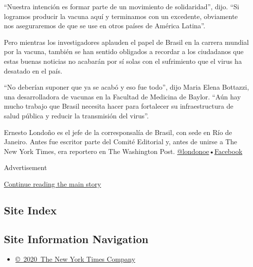 ``Nuestra intención es formar parte de un movimiento de solidaridad'',
dijo. ``Si logramos producir la vacuna aquí y terminamos con un
excedente, obviamente nos aseguraremos de que se use en otros países de
América Latina''.

Pero mientras los investigadores aplauden el papel de Brasil en la
carrera mundial por la vacuna, también se han sentido obligados a
recordar a los ciudadanos que estas buenas noticias no acabarán por sí
solas con el sufrimiento que el virus ha desatado en el país.

``No deberían suponer que ya se acabó y eso fue todo'', dijo Maria Elena
Bottazzi, una desarrolladora de vacunas en la Facultad de Medicina de
Baylor. ``Aún hay mucho trabajo que Brasil necesita hacer para
fortalecer su infraestructura de salud pública y reducir la transmisión
del virus''.

Ernesto Londoño es el jefe de la corresponsalía de Brasil, con sede en
Río de Janeiro. Antes fue escritor parte del Comité Editorial y, antes
de unirse a The New York Times, era reportero en The Washington Post.
\href{https://twitter.com/londonoe}{@londonoe}•\href{https://www.facebookcorewwwi.onion/londono}{Facebook}

Advertisement

\protect\hyperlink{after-bottom}{Continue reading the main story}

\hypertarget{site-index}{%
\subsection{Site Index}\label{site-index}}

\hypertarget{site-information-navigation}{%
\subsection{Site Information
Navigation}\label{site-information-navigation}}

\begin{itemize}
\tightlist
\item
  \href{https://help.nytimes3xbfgragh.onion/hc/en-us/articles/115014792127-Copyright-notice}{©~2020~The
  New York Times Company}
\end{itemize}

